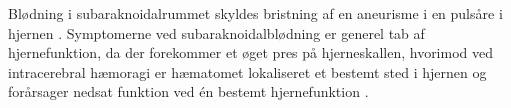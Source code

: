 Blødning i subaraknoidalrummet skyldes bristning af en aneurisme i en pulsåre i hjernen \cite{Schulze2011}. Symptomerne ved subaraknoidalblødning er generel tab af hjernefunktion, da der forekommer et øget pres på hjerneskallen, hvorimod ved intracerebral hæmoragi er hæmatomet lokaliseret et bestemt sted i hjernen og forårsager nedsat funktion ved én bestemt hjernefunktion \cite{Caplan2006}. 









